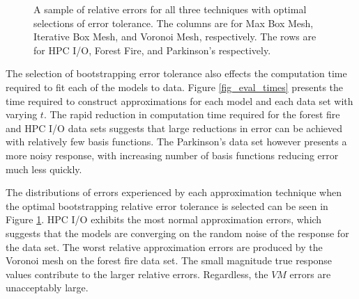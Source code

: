 \begin{figure}
  \caption{A sample of relative errors for all three techniques with optimal selections of error tolerance. The columns are for Max Box Mesh, Iterative Box Mesh, and Voronoi Mesh, respectively. The rows are for HPC I/O, Forest Fire, and Parkinson's respectively.
    \vspace{-.3cm}}
  \label{fig_perf_sample}
\end{figure}

The selection of bootstrapping error tolerance also effects the computation time required to fit each of the models to data. Figure \ref{fig_eval_times} presents the time required to construct approximations for each model and each data set with varying $t$. The rapid reduction in computation time required for the forest fire and HPC I/O data sets suggests that large reductions in error can be achieved with relatively few basis functions. The Parkinson's data set however presents a more noisy response, with increasing number of basis functions reducing error much less quickly.

The distributions of errors experienced by each approximation technique when the optimal bootstrapping relative error tolerance is selected can be seen in Figure \ref{fig_perf_sample}. HPC I/O exhibits the most normal approximation errors, which suggests that the models are converging on the random noise of the response for the data set. The worst relative approximation errors are produced by the Voronoi mesh on the forest fire data set. The small magnitude true response values contribute to the larger relative errors. Regardless, the $VM$ errors are unacceptably large.

